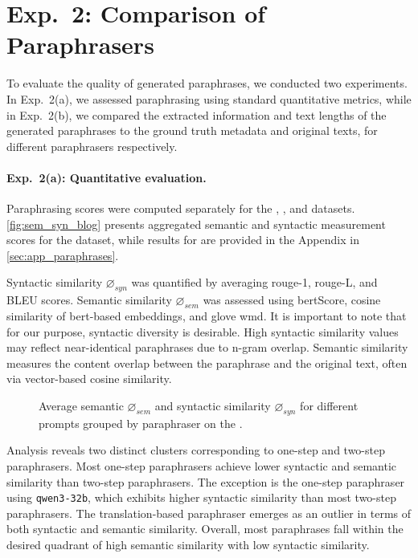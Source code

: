 \section{Exp.\ 2: Comparison of Paraphrasers}
\label{sec:comp_paraphrases}

To evaluate the quality of generated paraphrases, we conducted two experiments. 
In Exp.\ 2(a), we assessed paraphrasing using standard quantitative metrics, while in Exp.\ 2(b), we compared the extracted information and text lengths of the generated paraphrases to the ground truth metadata and original texts, for different paraphrasers respectively.

\paragraph{Exp.\ 2(a): Quantitative evaluation.}

Paraphrasing scores were computed separately for the \dataBlog{}, \dataGutenberg{}, and \dataStudent{} datasets. 
\autoref{fig:sem_syn_blog} presents aggregated semantic and syntactic measurement scores for the \dataBlog{} dataset, while results for \dataGutenberg{} are provided in the Appendix in \autoref{sec:app_paraphrases}.

Syntactic similarity $\diameter_{syn}$ was quantified by averaging \ac{rouge}-1, \ac{rouge}-L, and BLEU scores. 
Semantic similarity $\diameter_{sem}$ was assessed using \ac{bert}Score, cosine similarity of \ac{bert}-based embeddings, and \acs{glove} \ac{wmd}. 
It is important to note that for our purpose, syntactic diversity is desirable.
High syntactic similarity values may reflect near-identical paraphrases due to n-gram overlap. 
Semantic similarity measures the content overlap between the paraphrase and the original text, often via vector-based cosine similarity. 

\begin{figure}[htbp]
    \centering
    
    \caption[Comparison of paraphrasers on the \dataBlog{} dataset.]{Average semantic $\diameter_{sem}$ and syntactic similarity $\diameter_{syn}$ for different prompts grouped by paraphraser on the \dataBlog{}.}
    \label{fig:sem_syn_blog}
\end{figure}


Analysis reveals two distinct clusters corresponding to one-step and two-step paraphrasers. 
Most one-step paraphrasers achieve lower syntactic and semantic similarity than two-step paraphrasers. 
The exception is the one-step paraphraser using \texttt{qwen3-32b}, which exhibits higher syntactic similarity than most two-step paraphrasers. 
The translation-based paraphraser emerges as an outlier in terms of both syntactic and semantic similarity. 
Overall, most paraphrases fall within the desired quadrant of high semantic similarity with low syntactic similarity.


